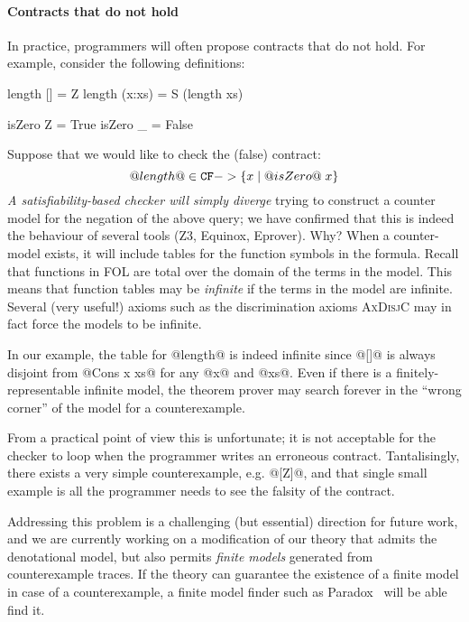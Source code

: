 \paragraph{Contracts that do not hold}
\label{ssect:countersat}

In practice, programmers will often propose contracts that do not hold. 
For example, consider the following definitions:
\begin{code}
  length []     = Z
  length (x:xs) = S (length xs)

  isZero Z = True
  isZero _ = False
\end{code}
Suppose that we would like to check the (false) contract:
   \[ @length@ \in {\tt CF} -> \{ x \mid @isZero@\;x\} \]
\emph{A satisfiability-based checker 
will simply diverge} trying to construct a counter model for the
negation of the above query; we have confirmed that this is indeed the
behaviour of several tools (Z3, Equinox, Eprover).  Why?  When a
counter-model exists, it will include tables for the function symbols
in the formula. Recall that functions in FOL are total over the domain
of the terms in the model. This means that function tables may be {\em
infinite} if the terms in the model are infinite. Several (very
useful!)  axioms such as the discrimination axioms \textsc{AxDisjC}
may in fact force the models to be infinite.

In our example, the table for @length@ is indeed infinite since @[]@ is
always disjoint from @Cons x xs@ for any @x@ and @xs@. Even if there
is a finitely-representable infinite model, the theorem prover may
search forever in the ``wrong corner'' of the model for a
counterexample.

From a practical point of view this is unfortunate; it is not
acceptable for the checker to loop when the programmer writes an
erroneous contract.  Tantalisingly, there exists a very simple
counterexample, e.g. @[Z]@, and that single small example is all the
programmer needs to see the falsity of the contract.

Addressing this problem is a challenging (but essential) 
direction for future work, and we are currently 
working on a modification of our theory that admits the denotational model, but 
also permits {\em finite models} generated from counterexample traces.
If the theory can guarantee the existence of a finite model in case of a counterexample,
a finite model finder such as Paradox~\cite{paradox} will be able find it.

